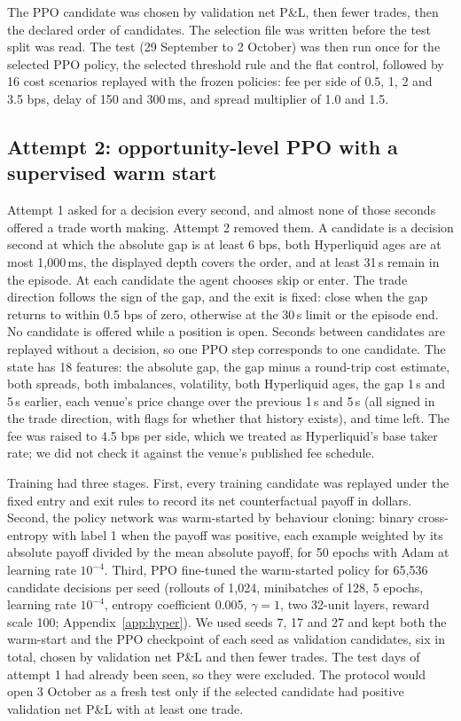\documentclass[12pt,a4paper]{article}
\DeclareRobustCommand{\bps}{\ifmmode\,\text{bps}\else\,bps\fi}
\begin{document}
The PPO candidate was chosen by validation net P\&L, then fewer trades, then the declared
order of candidates. The selection file was written before the test split was read. The
test (29 September to 2 October) was then run once for the selected PPO policy, the
selected threshold rule and the flat control, followed by 16 cost scenarios replayed with
the frozen policies: fee per side of 0.5, 1, 2 and 3.5\bps, delay of 150 and 300\,ms, and
spread multiplier of 1.0 and 1.5.

\subsection{Attempt 2: opportunity-level PPO with a supervised warm start}
Attempt 1 asked for a decision every second, and almost none of those seconds offered a
trade worth making. Attempt 2 removed them. A candidate is a decision second at which the
absolute gap is at least 6\bps, both Hyperliquid ages are at most 1,000\,ms, the displayed
depth covers the order, and at least 31\,s remain in the episode. At each candidate the
agent chooses skip or enter. The trade direction follows the sign of the gap, and the exit
is fixed: close when the gap returns to within 0.5\bps{} of zero, otherwise at the 30\,s
limit or the episode end. No candidate is offered while a position is open. Seconds between
candidates are replayed without a decision, so one PPO step corresponds to one candidate.
The state has 18 features: the absolute gap, the gap minus a round-trip cost estimate, both
spreads, both imbalances, volatility, both Hyperliquid ages, the gap 1\,s and 5\,s earlier,
each venue's price change over the previous 1\,s and 5\,s (all signed in the trade
direction, with flags for whether that history exists), and time left. The fee was raised
to 4.5\bps{} per side, which we treated as Hyperliquid's base taker rate; we did not check it
against the venue's published fee schedule.

Training had three stages. First, every training candidate was replayed under the fixed
entry and exit rules to record its net counterfactual payoff in dollars. Second, the policy
network was warm-started by behaviour cloning: binary cross-entropy with label 1 when the
payoff was positive, each example weighted by its absolute payoff divided by the mean
absolute payoff, for 50 epochs with Adam at learning rate $10^{-4}$. Third, PPO fine-tuned
the warm-started policy for 65,536 candidate decisions per seed (rollouts of 1,024,
minibatches of 128, 5 epochs, learning rate $10^{-4}$, entropy coefficient 0.005,
$\gamma=1$, two 32-unit layers, reward scale 100; Appendix~\ref{app:hyper}). We used seeds 7,
17 and 27 and kept both the warm-start and the PPO checkpoint of each seed as validation
candidates, six in total, chosen by validation net P\&L and then fewer trades. The test days
of attempt 1 had already been seen, so they were excluded. The protocol would open 3 October
as a fresh test only if the selected candidate had positive validation net P\&L with at least
one trade.
\end{document}
